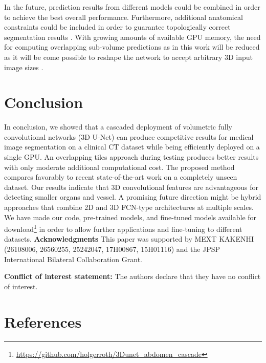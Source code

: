 \documentclass[authoryear]{elsarticle}
\begin{document}
In the future, prediction results from different models could be combined in order to achieve the best overall performance. Furthermore, additional anatomical constraints could be included in order to guarantee topologically correct segmentation results \citep{bentaieb2016topology,oktay2017anatomically}. With growing amounts of available GPU memory, the need for computing overlapping sub-volume predictions as in this work will be reduced as it will be come possible to reshape the network to accept arbitrary 3D input image sizes \citep{long2015fully}.
\section{Conclusion}
In conclusion, we showed that a cascaded deployment of volumetric fully convolutional networks (3D U-Net) can produce competitive results for medical image segmentation on a clinical CT dataset while being efficiently deployed on a single GPU. An overlapping tiles approach during testing produces better results with only moderate additional computational cost. The proposed method compares favorably to recent state-of-the-art work on a completely unseen dataset. Our results indicate that 3D convolutional features are advantageous for detecting smaller organs and vessel. A promising future direction might be hybrid approaches that combine 2D and 3D FCN-type architectures at multiple scales. We have made our code, pre-trained models, and fine-tuned models available for download\footnote{\url{https://github.com/holgerroth/3Dunet_abdomen_cascade}} in order to allow further applications and fine-tuning to different datasets.
\linebreak
\linebreak
\textbf{Acknowledgments } This paper was supported by MEXT KAKENHI (26108006, 26560255, 25242047, 17H00867, 15H01116) and the JPSP International Bilateral Collaboration Grant. 
\begin{flushleft}
\vspace{2em}
\textbf{Conflict of interest statement: } The authors declare that they have no conflict of interest.
\end{flushleft}
\section*{References}

\end{document}
